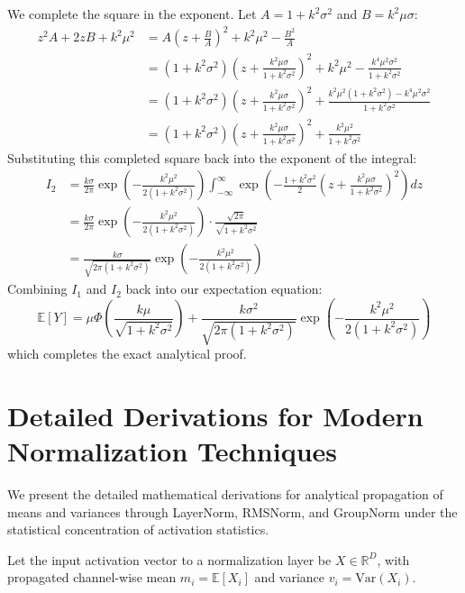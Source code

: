 \documentclass{article}
\theoremstyle{plain}
\theoremstyle{definition}
\theoremstyle{remark}
\begin{document}
We complete the square in the exponent. Let $A = 1+k^2\sigma^2$ and $B = k^2\mu\sigma$:
\begin{align}
    z^2 A + 2z B + k^2\mu^2 &= A \left( z + \frac{B}{A} \right)^2 + k^2\mu^2 - \frac{B^2}{A} \nonumber \\
    &= (1+k^2\sigma^2) \left( z + \frac{k^2\mu\sigma}{1+k^2\sigma^2} \right)^2 + k^2\mu^2 - \frac{k^4\mu^2\sigma^2}{1+k^2\sigma^2} \nonumber \\
    &= (1+k^2\sigma^2) \left( z + \frac{k^2\mu\sigma}{1+k^2\sigma^2} \right)^2 + \frac{k^2\mu^2(1+k^2\sigma^2) - k^4\mu^2\sigma^2}{1+k^2\sigma^2} \nonumber \\
    &= (1+k^2\sigma^2) \left( z + \frac{k^2\mu\sigma}{1+k^2\sigma^2} \right)^2 + \frac{k^2\mu^2}{1+k^2\sigma^2}
\end{align}
Substituting this completed square back into the exponent of the integral:
\begin{align}
    I_2 &= \frac{k\sigma}{2\pi} \exp\left( -\frac{k^2\mu^2}{2(1+k^2\sigma^2)} \right) \int_{-\infty}^{\infty} \exp\left( -\frac{1+k^2\sigma^2}{2} \left( z + \frac{k^2\mu\sigma}{1+k^2\sigma^2} \right)^2 \right) dz \nonumber \\
    &= \frac{k\sigma}{2\pi} \exp\left( -\frac{k^2\mu^2}{2(1+k^2\sigma^2)} \right) \cdot \frac{\sqrt{2\pi}}{\sqrt{1+k^2\sigma^2}} \nonumber \\
    &= \frac{k\sigma}{\sqrt{2\pi(1+k^2\sigma^2)}} \exp\left( -\frac{k^2\mu^2}{2(1+k^2\sigma^2)} \right)
\end{align}
Combining $I_1$ and $I_2$ back into our expectation equation:
\begin{equation}
    \mathbb{E}[Y] = \mu \Phi\left(\frac{k \mu}{\sqrt{1+k^2\sigma^2}}\right) + \frac{k\sigma^2}{\sqrt{2\pi(1+k^2\sigma^2)}} \exp\left(-\frac{k^2\mu^2}{2(1+k^2\sigma^2)}\right)
\end{equation}
which completes the exact analytical proof.

\section{Detailed Derivations for Modern Normalization Techniques}
\label{app:normalization}

We present the detailed mathematical derivations for analytical propagation of means and variances through LayerNorm, RMSNorm, and GroupNorm under the statistical concentration of activation statistics.

Let the input activation vector to a normalization layer be $X \in \mathbb{R}^D$, with propagated channel-wise mean $m_i = \mathbb{E}[X_i]$ and variance $v_i = \text{Var}(X_i)$.
\end{document}
